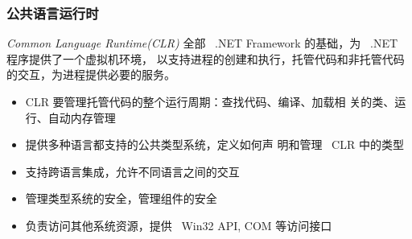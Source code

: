 \begin{frame}
\frametitle{公共语言运行时}
\begin{block}{\textit{Common Language Runtime(CLR)}}
  \CJKindent 全部 ~.NET Framework 的基础，为 ~.NET 程序提供了一个虚拟机环境，
  以支持进程的创建和执行，托管代码和非托管代码的交互，为进程提供必要的服务。
\end{block}


\begin{itemize}
\item<2-| handout:1> CLR 要管理\alert<2| handout:0>{托管代码}的整个运行周期：查找代码、编译、加载相
  关的类、运行、自动内存管理
\item<3-| handout:1> 提供多种语言都支持的\alert<3| handout:0>{公共类型系统}，定义如何声
  明和管理 ~CLR 中的类型
\item<4-| handout:1> 支持跨语言集成，允许不同语言之间的交互
\item<5-| handout:1> 管理类型系统的安全，管理组件的安全
\item<6-| handout:1> 负责访问其他系统资源，提供 ~Win32 API, COM 等访问接口
\end{itemize}

\end{frame}

